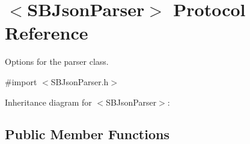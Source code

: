 \hypertarget{protocol_s_b_json_parser-p}{
\section{$<$\-S\-B\-Json\-Parser$>$ \-Protocol \-Reference}
\label{protocol_s_b_json_parser-p}
}


\-Options for the parser class.  




{\ttfamily \#import $<$\-S\-B\-Json\-Parser.\-h$>$}



\-Inheritance diagram for $<$\-S\-B\-Json\-Parser$>$\-:
\subsection*{\-Public \-Member \-Functions}
